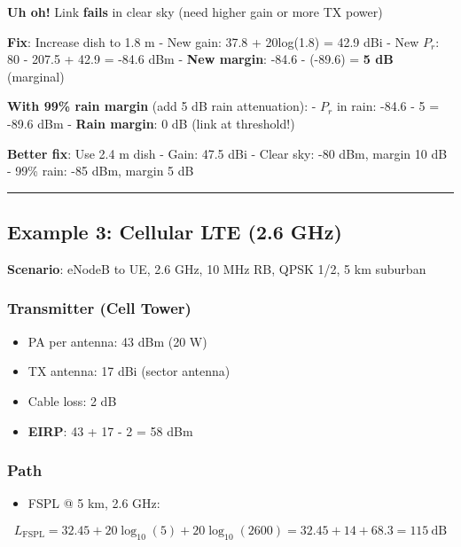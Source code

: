\textbf{Uh oh!} Link \textbf{fails} in clear sky (need higher gain or
more TX power)

\textbf{Fix}: Increase dish to 1.8 m - New gain: 37.8 + 20log(1.8) =
42.9 dBi - New \(P_r\): 80 - 207.5 + 42.9 = -84.6 dBm - \textbf{New
margin}: -84.6 - (-89.6) = \textbf{5 dB} (marginal)

\textbf{With 99\% rain margin} (add 5 dB rain attenuation): - \(P_r\) in
rain: -84.6 - 5 = -89.6 dBm - \textbf{Rain margin}: 0 dB (link at
threshold!)

\textbf{Better fix}: Use 2.4 m dish - Gain: 47.5 dBi - Clear sky: -80
dBm, margin 10 dB - 99\% rain: -85 dBm, margin 5 dB

\begin{center}\rule{0.5\linewidth}{0.5pt}\end{center}

\subsection{Example 3: Cellular LTE (2.6
GHz)}\label{example-3-cellular-lte-2.6-ghz}

\textbf{Scenario}: eNodeB to UE, 2.6 GHz, 10 MHz RB, QPSK 1/2, 5 km
suburban

\subsubsection{Transmitter (Cell Tower)}\label{transmitter-cell-tower}

\begin{itemize}
\tightlist
\item
  PA per antenna: 43 dBm (20 W)
\item
  TX antenna: 17 dBi (sector antenna)
\item
  Cable loss: 2 dB
\item
  \textbf{EIRP}: 43 + 17 - 2 = 58 dBm
\end{itemize}

\subsubsection{Path}\label{path-2}

\begin{itemize}
\tightlist
\item
  FSPL @ 5 km, 2.6 GHz:
\end{itemize}

\[
L_{\text{FSPL}} = 32.45 + 20\log_{10}(5) + 20\log_{10}(2600) = 32.45 + 14 + 68.3 = 115\ \text{dB}
\]

